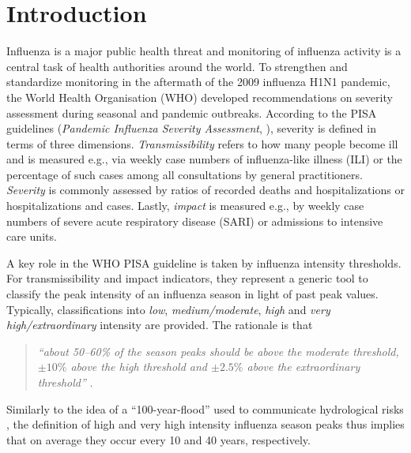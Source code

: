 \documentclass[12pt]{article}
\begin{document}
\newpage


\section{Introduction}
\label{sec:introduction}

Influenza is a major public health threat and monitoring of influenza activity is a central task of health authorities around the world. To strengthen and standardize monitoring in the aftermath of the 2009 influenza H1N1 pandemic, the World Health Organisation (WHO) developed recommendations on severity assessment during seasonal and pandemic outbreaks. According to the PISA guidelines (\textit{Pandemic Influenza Severity Assessment}, \citealt{WHO2014}), severity is defined in terms of three dimensions. \textit{Transmissibility} refers to how many people become ill and is measured e.g., via weekly case numbers of influenza-like illness (ILI) or the percentage of such cases among all consultations by general practitioners. \textit{Severity} is commonly assessed by ratios of recorded deaths and hospitalizations or hospitalizations and cases. Lastly, \textit{impact} is measured e.g., by weekly case numbers of severe acute respiratory disease (SARI) or admissions to intensive care units.

A key role in the WHO PISA guideline is taken by influenza intensity thresholds. For transmissibility and impact indicators, they represent a generic tool to classify the peak intensity of an influenza season in light of past peak values. Typically, classifications into \textit{low}, \textit{medium/moderate}, \textit{high} and \textit{very high/extraordinary} intensity are provided. The rationale is that
\begin{quote}
\textit{``about 50--60\% of the season peaks should be above the moderate threshold, $\pm 10\%$ above the high threshold and $\pm 2.5\%$ above the extraordinary threshold''} \citep[p.10]{WHO2017}.
\end{quote}
Similarly to the idea of a ``100-year-flood'' used to communicate hydrological risks \citep{Holmes2010}, the definition of high and very high intensity influenza season peaks thus implies that on average they occur every 10 and 40 years, respectively.
\end{document}
